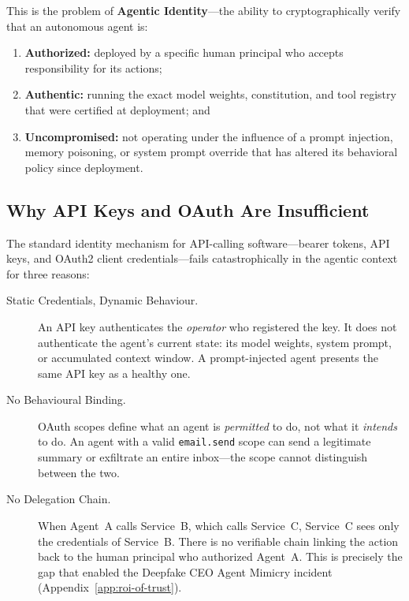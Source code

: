 This is the problem of \textbf{Agentic Identity}---the ability
to cryptographically verify that an autonomous agent is:
\begin{enumerate}
  \item \textbf{Authorized:} deployed by a specific human
    principal who accepts responsibility for its actions;
  \item \textbf{Authentic:} running the exact model weights,
    constitution, and tool registry that were certified at
    deployment; and
  \item \textbf{Uncompromised:} not operating under the influence
    of a prompt injection, memory poisoning, or system prompt
    override that has altered its behavioral policy since
    deployment.
\end{enumerate}

\subsection{Why API Keys and OAuth Are Insufficient}
\label{subsec:api-key-failure}

The standard identity mechanism for API-calling
software---bearer tokens, API keys, and OAuth2 client
credentials---fails catastrophically in the agentic context
for three reasons:

\begin{description}
  \item[Static Credentials, Dynamic Behaviour.]
    An API key authenticates the \emph{operator} who registered
    the key.
    It does not authenticate the agent's current state: its
    model weights, system prompt, or accumulated context
    window.
    A prompt-injected agent presents the same API key as a
    healthy one.

  \item[No Behavioural Binding.]
    OAuth scopes define what an agent is \emph{permitted} to
    do, not what it \emph{intends} to do.
    An agent with a valid \texttt{email.send} scope can send a
    legitimate summary or exfiltrate an entire inbox---the
    scope cannot distinguish between the two.

  \item[No Delegation Chain.]
    When Agent~A calls Service~B, which calls Service~C,
    Service~C sees only the credentials of Service~B.
    There is no verifiable chain linking the action back to the
    human principal who authorized Agent~A.
    This is precisely the gap that enabled the Deepfake CEO
    Agent Mimicry incident
    (Appendix~\ref{app:roi-of-trust}).
\end{description}

